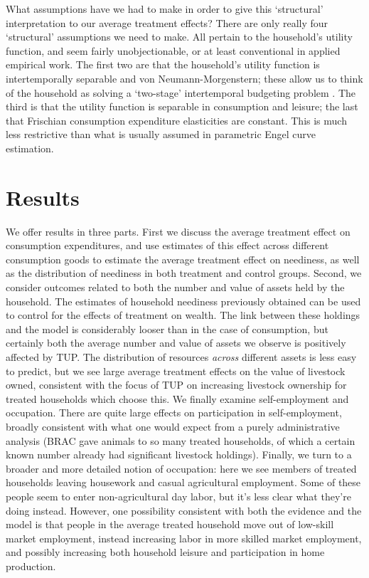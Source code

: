 \documentclass[11pt]{article}
\begin{document}
What assumptions have we had to make in order to give this
`structural' interpretation to our average treatment effects?  There
are only really four `structural' assumptions we need to make.  All
pertain to the household's utility function, and seem fairly
unobjectionable, or at least conventional in applied empirical work.
The first two are that the household's utility function is
intertemporally separable and von Neumann-Morgenstern; these allow us
to think of the household as solving a `two-stage' intertemporal
budgeting problem \citep{gorman59}. The third is that the utility function is separable
in consumption and leisure; the last that Frischian consumption
expenditure elasticities are constant.  This is much less restrictive
than what is usually assumed in parametric Engel curve estimation.

\section*{Results}
\label{sec-6}

We offer results in three parts.  First we discuss the average
treatment effect on consumption expenditures, and use estimates of
this effect across different consumption goods to estimate the average
treatment effect on neediness, as well as the distribution of
neediness in both treatment and control groups.  Second, we consider
outcomes related to both the number and value of assets held by the
household.  The estimates of household neediness previously obtained
can be used to control for the effects of treatment on wealth.  The
link between these holdings and the model is considerably looser than
in the case of consumption, but certainly both the average number and
value of assets we observe is positively affected by TUP.  The
distribution of resources \emph{across} different assets is less easy to
predict, but we see large average treatment effects on the value of
livestock owned, consistent with the focus of TUP on increasing
livestock ownership for treated households which choose this.  We
finally examine self-employment and occupation.  There are quite large
effects on participation in self-employment, broadly consistent with
what one would expect from a purely administrative analysis (BRAC gave
animals to so many treated households, of which a certain known number
already had significant livestock holdings).  Finally, we turn to a
broader and more detailed notion of occupation: here we see members of
treated households leaving housework and casual agricultural
employment.  Some of these people seem to enter non-agricultural day
labor, but it's less clear what they're doing instead.  However, one
possibility consistent with both the evidence and the model is that
people in the average treated household move out of low-skill market
employment, instead increasing labor in more skilled market
employment, and possibly increasing both household leisure and
participation in home production.
\end{document}
